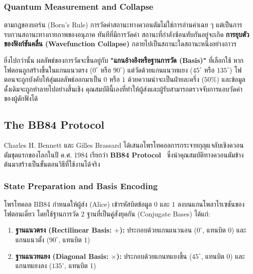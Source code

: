 \subsubsection{Quantum Measurement and Collapse}
ตามกฎของบอร์น (Born's Rule) การวัดค่าสถานะทางควอนตัมไม่ใช่การอ่านค่าเฉย ๆ แต่เป็นการรบกวนสถานะทางกายภาพของอนุภาค ทันทีที่มีการวัดค่า สถานะที่กำลังซ้อนทับกันอยู่จะเกิด \textbf{การยุบตัวของฟังก์ชันคลื่น (Wavefunction Collapse)} กลายไปเป็นสถานะใดสถานะหนึ่งอย่างถาวร

ยิ่งไปกว่านั้น ผลลัพธ์ของการวัดจะขึ้นอยู่กับ \textbf{"แกนอ้างอิงหรือฐานการวัด (Basis)"} ที่เลือกใช้ หากโฟตอนถูกสร้างขึ้นในแกนแนวตรง ($0^\circ$ หรือ $90^\circ$) แต่วัดด้วยแกนแนวทแยง ($45^\circ$ หรือ $135^\circ$) โฟตอนจะถูกบังคับให้สุ่มผลลัพธ์ออกมาเป็น $0$ หรือ $1$ ด้วยความน่าจะเป็นฝ่ายละครึ่ง ($50\%$) และข้อมูลดั้งเดิมจะถูกทำลายไปอย่างสิ้นเชิง คุณสมบัตินี้เองที่ทำให้ผู้ส่งและผู้รับสามารถตรวจจับการแอบวัดค่าของผู้ดักฟังได้

\subsection{The BB84 Protocol}
Charles H. Bennett และ Gilles Brassard ได้เสนอโพรโทคอลการกระจายกุญแจลับเชิงควอนตัมชุดแรกของโลกในปี ค.ศ. 1984 เรียกว่า \textbf{BB84 Protocol}~\cite{bb84} ซึ่งนำคุณสมบัติทางควอนตัมข้างต้นมาสร้างเป็นขั้นตอนวิธีที่ใช้งานได้จริง

\subsubsection{State Preparation and Basis Encoding}
โพรโทคอล BB84 กำหนดให้ผู้ส่ง (Alice) เข้ารหัสบิตข้อมูล $0$ และ $1$ ลงบนแกนโพลาไรเซชันของโฟตอนเดี่ยว โดยใช้ฐานการวัด 2 ฐานที่เป็นคู่สังยุคกัน (Conjugate Bases) ได้แก่:
\begin{enumerate}
    \item \textbf{ฐานแนวตรง (Rectilinear Basis: $+$):} ประกอบด้วยแกนแนวนอน ($0^\circ$, แทนบิต 0) และแกนแนวตั้ง ($90^\circ$, แทนบิต 1)
    \item \textbf{ฐานแนวทแยง (Diagonal Basis: $\times$):} ประกอบด้วยแกนทแยงขึ้น ($45^\circ$, แทนบิต 0) และแกนทแยงลง ($135^\circ$, แทนบิต 1)
\end{enumerate}

